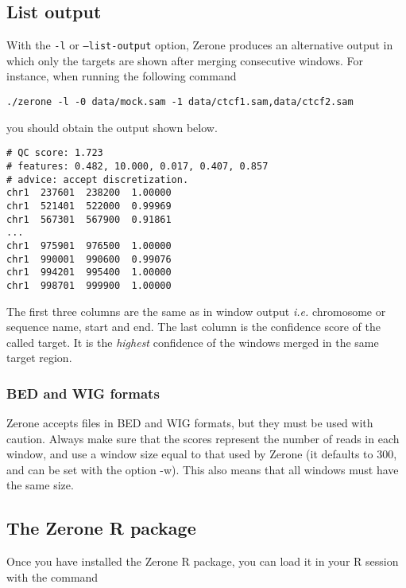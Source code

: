 \documentclass[12pt]{article}
\begin{document}
\subsection{List output}

With the \texttt{-l} or \texttt{--list-output} option, Zerone produces
an alternative output in which only the targets are shown after
merging consecutive windows. For instance, when running the following
command

\begin{verbatim}
./zerone -l -0 data/mock.sam -1 data/ctcf1.sam,data/ctcf2.sam
\end{verbatim}

\noindent
you should obtain the output shown below.

\begin{verbatim}
# QC score: 1.723
# features: 0.482, 10.000, 0.017, 0.407, 0.857
# advice: accept discretization.
chr1  237601  238200  1.00000
chr1  521401  522000  0.99969
chr1  567301  567900  0.91861
...
chr1  975901  976500  1.00000
chr1  990001  990600  0.99076
chr1  994201  995400  1.00000
chr1  998701  999900  1.00000
\end{verbatim}

The first three columns are the same as in window output \textit{i.e.}
chromosome or sequence name, start and end. The last column is the
confidence score of the called target. It is the \textit{highest}
confidence of the windows merged in the same target region.

\begin{mdframed}
\subsubsection*{BED and WIG formats}
Zerone accepts files in BED and WIG formats, but they must be used with
caution. Always make sure that the scores represent the number of reads in
each window, and use a window size equal to that used by Zerone (it defaults
to 300, and can be set with the option -w). This also means that all windows
must have the same size.
\end{mdframed}

\subsection*{The Zerone R package}

Once you have installed the Zerone R package, you can load it in
your R session with the command
\end{document}
